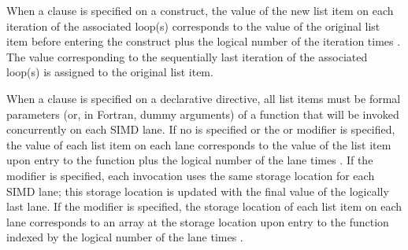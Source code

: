 When a  clause is specified on a construct, the value of the new list item on each iteration of the associated loop(s) corresponds to the value of the original list item before entering the construct plus the logical number of the iteration times .
The value corresponding to the sequentially last iteration of the associated loop(s) is assigned to the original list item.

When a  clause is specified on a declarative directive, all list items must be formal parameters (or, in Fortran, dummy arguments) of a function that will be invoked concurrently on each SIMD lane.
If no  is specified or the  or  modifier is specified, the value of each list item on each lane corresponds to the value of the list item upon entry to the function plus the logical number of the lane times .
If the  modifier is specified, each invocation uses the same storage location for each SIMD lane; this storage location is updated with the final value of the logically last lane.
If the  modifier is specified, the storage location of each list item on each lane corresponds to an array at the storage location upon entry to the function indexed by the logical number of the lane times .


